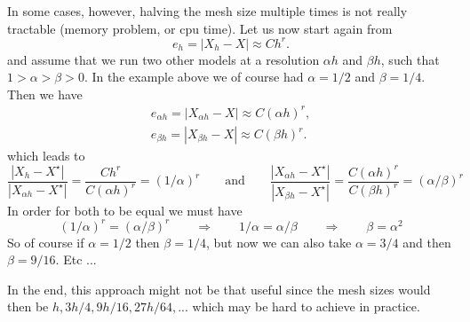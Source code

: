 In some cases, however, halving the mesh size multiple times 
is not really tractable (memory problem, or cpu time).
Let us now start again from 
\begin{equation}
  e_h=|X_h-X| \approx C h^r.
\end{equation}
and assume that we run two other models at a resolution $\alpha h$
and $\beta h$, such that $1>\alpha>\beta>0$. 
In the example above we of course had $\alpha=1/2$ and $\beta=1/4$.
Then we have 
\begin{eqnarray}
e_{\alpha h}=|X_{\alpha h}-X| \approx C \left(\alpha h\right)^r,  \\
e_{\beta  h}=|X_{\beta h} -X| \approx C \left(\beta  h\right)^r.
\end{eqnarray}
which leads to 
\begin{equation*}
\frac{|X_h-X^\star|}{|X_{\alpha h}-X^\star|}
= \frac{C h^r}{C (\alpha h)^r} = (1/\alpha)^{r}
\qquad
\text{and}
\qquad
\frac{|X_{\alpha h}-X^\star|}{|X_{\beta h}-X^\star|}
= \frac{C (\alpha h)^r}{C(\beta h)^r} = (\alpha/\beta)^r
\end{equation*}
In order for both to be equal we must have
\[
(1/\alpha)^{r} = (\alpha/\beta)^r
\qquad
\Rightarrow
\qquad
1/\alpha = \alpha/\beta
\qquad
\Rightarrow
\qquad
\beta=\alpha^2
\]
So of course if $\alpha=1/2$ then $\beta=1/4$, but now we can also take 
$\alpha=3/4$ and then $\beta=9/16$. Etc ...

In the end, this approach might not be that useful since the mesh sizes would
then be $h,3h/4,9h/16,27h/64,...$ which may be hard to achieve in practice.

